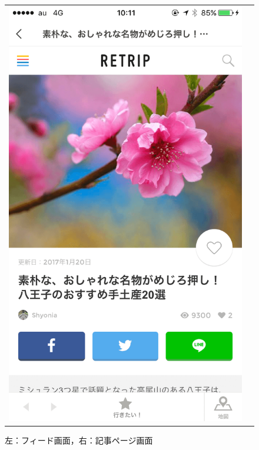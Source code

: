 \documentclass[a4paper]{jsarticle}
\begin{document}
\begin{enumerate}
\begin{enumerate}
\begin{figure}[H]
\begin{center}
\begin{tabular}{cc}
\begin{minipage}{0.35\hsize}
      \includegraphics[width=\hsize]{./images/curation_article.png}
    \end{minipage}
  \end{tabular}
    \caption{左：フィード画面，右：記事ページ画面}
    \label{fig:curation_screen_structure_01}
  \end{center}
\end{figure}
\fi


\end{enumerate}
\end{enumerate}
\end{document}
